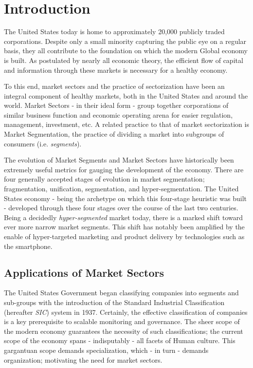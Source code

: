 \documentclass[../main.tex]{subfiles}
\begin{document}
    
\chapter{Introduction}

The United States today is home to approximately 20,000 publicly traded corporations. Despite only a small minority capturing the public eye on a regular basis, they all contribute to the foundation on which the modern Global economy is built. As postulated by nearly all economic theory, the efficient flow of capital and information through these markets is necessary for a healthy economy.

To this end, market sectors and the practice of sectorization have been an integral component of healthy markets, both in the United States and around the world. Market Sectors - in their ideal form - group together corporations of similar business function and economic operating arena for easier regulation, management, investment, etc. A related practice to that of market sectorization is Market Segmentation, the practice of dividing a market into subgroups of consumers (i.e. \textit{segments}).

The evolution of Market Segments and Market Sectors have historically been extremely useful metrics for gauging the development of the economy. There are four generally accepted stages of evolution in market segmentation; fragmentation, unification, segmentation, and hyper-segmentation. The United States economy - being the archetype on which this four-stage heuristic was built - developed through these four stages over the course of the last two centuries. Being a decidedly \textit{hyper-segmented} market today, there is a marked shift toward ever more narrow market segments. This shift has notably been amplified by the enable of hyper-targeted marketing and product delivery by technologies such as the smartphone.

\section{Applications of Market Sectors}

The United States Government began classifying companies into segments and sub-groups with the introduction of the Standard Industrial Classification (hereafter \textit{SIC}) system in 1937. Certainly, the effective classification of companies is a key prerequisite to scalable monitoring and governance. The sheer scope of the modern economy guarantees the necessity of such classifications; the current scope of the economy spans - indisputably - all facets of Human culture. This gargantuan scope demands specialization, which - in turn - demands organization; motivating the need for market sectors.
\end{document}
